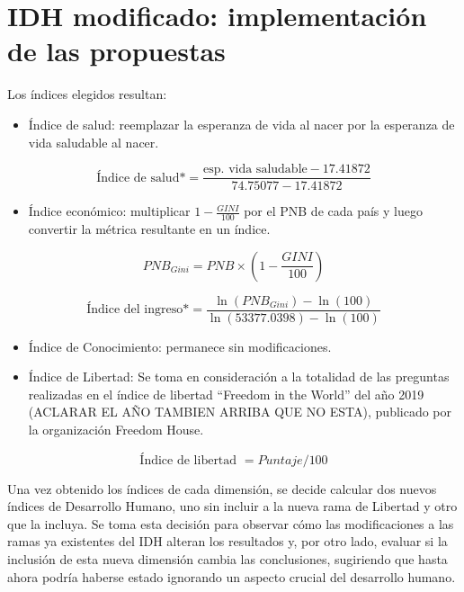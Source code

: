 \documentclass[
  10pt,
]{article}
\providecommand{\tightlist}{%
  \setlength{\itemsep}{0pt}\setlength{\parskip}{0pt}}
\begin{document}
\pagebreak

\section{IDH modificado: implementación de las
propuestas}\label{idh-modificado-implementaciuxf3n-de-las-propuestas}

Los índices elegidos resultan:

\begin{itemize}
\tightlist
\item
  Índice de salud: reemplazar la esperanza de vida al nacer por la
  esperanza de vida saludable al nacer.
\end{itemize}

\[\text{Índice de salud*} = \frac{\text{esp. vida saludable}-17.41872}{74.75077-17.41872}\]

\begin{itemize}
\tightlist
\item
  Índice económico: multiplicar \(1-\frac{GINI}{100}\) por el PNB de
  cada país y luego convertir la métrica resultante en un índice.
\end{itemize}

\[PNB_{Gini} = PNB \times \left(1-\frac{GINI}{100}\right)\]

\[\text{Índice del ingreso*}=\frac{\ln(PNB_{Gini})-\ln(100)}{\ln(53377.0398)-\ln(100)}\]

\begin{itemize}
\item
  Índice de Conocimiento: permanece sin modificaciones.
\item
  Índice de Libertad: Se toma en consideración a la totalidad de las
  preguntas realizadas en el índice de libertad ``Freedom in the World''
  del año 2019 (ACLARAR EL AÑO TAMBIEN ARRIBA QUE NO ESTA), publicado
  por la organización Freedom House.
\end{itemize}

\[\text{Índice de libertad } = Puntaje/100\]

Una vez obtenido los índices de cada dimensión, se decide calcular dos
nuevos índices de Desarrollo Humano, uno sin incluir a la nueva rama de
Libertad y otro que la incluya. Se toma esta decisión para observar cómo
las modificaciones a las ramas ya existentes del IDH alteran los
resultados y, por otro lado, evaluar si la inclusión de esta nueva
dimensión cambia las conclusiones, sugiriendo que hasta ahora podría
haberse estado ignorando un aspecto crucial del desarrollo humano.
\end{document}
